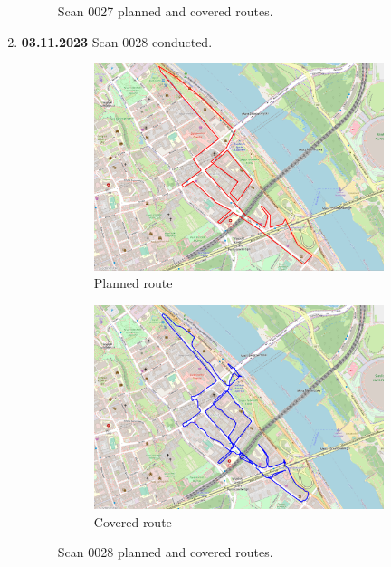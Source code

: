 \documentclass[a4paper,12pt]{book}
\begin{document}
\begin{enumerate}
\begin{figure}[H]
		\caption{Scan 0027 planned and covered routes.}
		\label{fig:fig27}
	\end{figure}
	\item \textbf{03.11.2023} Scan 0028 conducted.
	\begin{figure}[H]
		\centering
		\begin{subfigure}{.95\textwidth}
			\centering
			\includegraphics[width=1\linewidth]{route_p28}
			\caption{Planned route}
			\label{fig:a28}
		\end{subfigure}%
		\linebreak
		\begin{subfigure}{.95\textwidth}
			\centering
			\includegraphics[width=1\linewidth]{route_c28}
			\caption{Covered route}
			\label{fig:b28}
		\end{subfigure}
		\caption{Scan 0028 planned and covered routes.}
		\label{fig:fig28}
	\end{figure}
\end{enumerate}
\end{document}
